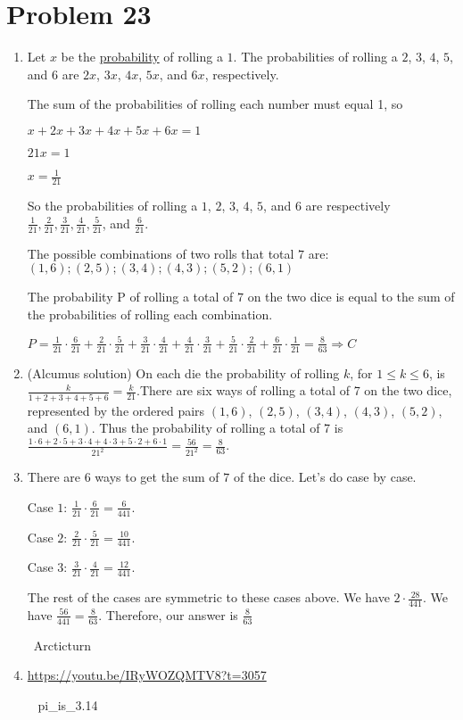 \documentclass{article}%
\begin{document}
\section*{Problem 23}%
\label{sec:Problem23}%
\begin{enumerate}%
\item%
Let $x$ be the \href{/wiki/index.php/Probability}{probability} of rolling a $1$. The probabilities of rolling a 
$2$, $3$, $4$, $5$, and $6$ are $2x$, $3x$, $4x$, $5x$, and $6x$, respectively.

The sum of the probabilities of rolling each number must equal 1, so

$x+2x+3x+4x+5x+6x=1$

$21x=1$

$x=\frac{1}{21}$

So the probabilities of rolling a $1$, $2$, $3$, $4$, $5$, and $6$ are respectively $\frac{1}{21}, \frac{2}{21}, \frac{3}{21}, \frac{4}{21}, \frac{5}{21}$, and $\frac{6}{21}$. 

The possible combinations of two rolls that total $7$ are: $(1,6) ; (2,5) ; (3,4) ; (4,3) ; (5,2) ; (6,1)$

The probability P of rolling a total of $7$ on the two dice is equal to the sum of the probabilities of rolling each combination. 

$P = \frac{1}{21}\cdot\frac{6}{21}+\frac{2}{21}\cdot\frac{5}{21}+\frac{3}{21}\cdot\frac{4}{21}+\frac{4}{21}\cdot\frac{3}{21}+\frac{5}{21}\cdot\frac{2}{21}+\frac{6}{21}\cdot\frac{1}{21}=\frac{8}{63} \Rightarrow C$

%
\item%
(Alcumus solution)
On each die the probability of rolling $k$, for $1\leq k\leq 6$, is $\frac{k}{1+2+3+4+5+6}=\frac{k}{21}.$There are six ways of rolling a total of 7 on the two dice, represented by the ordered pairs $(1,6)$, $(2,5)$, $(3,4)$, $(4,3)$, $(5,2)$, and $(6,1)$. Thus the probability of rolling a total of 7 is $\frac{1\cdot6+2\cdot5+3\cdot4+4\cdot3+5\cdot2+6\cdot1}{21^2}=\frac{56}{21^2}=\boxed{\frac{8}{63}}.$

%
\item%
There are $6$ ways to get the sum of $7$ of the dice. Let's do case by case.

Case $1$: $\frac {1}{21} \cdot \frac {6}{21} = \frac {6}{441}$.

Case $2$: $\frac {2}{21} \cdot \frac {5}{21} = \frac {10}{441}$. 

Case $3$: $\frac {3}{21} \cdot \frac {4}{21} = \frac {12}{441}$. 

The rest of the cases are symmetric to these cases above. We have $2 \cdot \frac {28}{441}$. We have $\frac {56}{441} = \frac {8}{63}$. Therefore, our answer is $\boxed {\frac {8}{63}}$

~Arcticturn

%
\item%
\href{https://youtu.be/IRyWOZQMTV8?t=3057}{https://youtu.be/IRyWOZQMTV8?t=3057}

~ pi\_is\_3.14

%
\end{enumerate}
\end{document}
